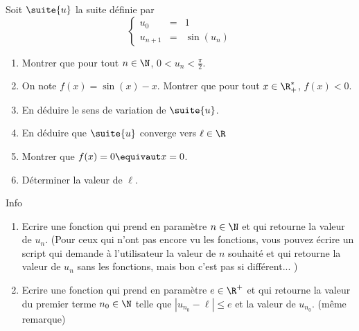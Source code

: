 \begin{exercice}
Soit $\suite{u}$ la suite définie par 
$$\left\{ 
\begin{array}{ccl}
u_0&=&1\\
u_{n+1} &=& \sin(u_n)
\end{array}
\right.$$

\begin{enumerate}
\item Montrer que pour tout $n\in \N$, $0<u_n<\frac{\pi}{2}$.
\item On note $f(x) = \sin(x)-x$. Montrer que pour tout $x\in \R_+^*$, $f(x)<0.$
\item En déduire le sens de variation de $\suite{u}$.
\item En déduire que $\suite{u}$ converge vers $\ell \in \R$
\item  Montrer que $f(x)=0 \equivaut x=0$.
\item Déterminer la valeur de $\ell$. 
\end{enumerate}

Info 
\begin{enumerate}
\item Ecrire une fonction qui prend en paramètre $n\in \N$ et qui retourne la valeur de $u_n$. (Pour ceux qui n'ont pas encore vu les fonctions, vous pouvez écrire un script qui demande à l'utilisateur la valeur de $n$ souhaité et qui retourne la valeur de $u_n$ sans les fonctions, mais bon c'est pas si différent... ) 
\item 
Ecrire une fonction qui prend en paramètre $e\in \R^+$ et qui retourne la valeur du premier terme $n_0\in \N$ telle que $|u_{n_0}-\ell| \leq e$ et la valeur de $u_{n_0}$. (même remarque) 
\end{enumerate}

\end{exercice}

